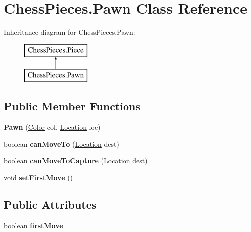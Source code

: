 \hypertarget{class_chess_pieces_1_1_pawn}{}\section{Chess\+Pieces.\+Pawn Class Reference}
\label{class_chess_pieces_1_1_pawn}
Inheritance diagram for Chess\+Pieces.\+Pawn\+:\begin{figure}[H]
\begin{center}
\leavevmode
\includegraphics[height=2.000000cm]{class_chess_pieces_1_1_pawn}
\end{center}
\end{figure}
\subsection*{Public Member Functions}
\begin{DoxyCompactItemize}
\item 
{\bfseries Pawn} (\hyperlink{enum_chess_pieces_1_1_color}{Color} col, \hyperlink{class_chess_pieces_1_1_location}{Location} loc)\hypertarget{class_chess_pieces_1_1_pawn_a41a1661e7bb1ef858a8910002441cbdc}{}\label{class_chess_pieces_1_1_pawn_a41a1661e7bb1ef858a8910002441cbdc}

\item 
boolean {\bfseries can\+Move\+To} (\hyperlink{class_chess_pieces_1_1_location}{Location} dest)\hypertarget{class_chess_pieces_1_1_pawn_a33355d440166cb93ec9a2d7f3d093a0b}{}\label{class_chess_pieces_1_1_pawn_a33355d440166cb93ec9a2d7f3d093a0b}

\item 
boolean {\bfseries can\+Move\+To\+Capture} (\hyperlink{class_chess_pieces_1_1_location}{Location} dest)\hypertarget{class_chess_pieces_1_1_pawn_a18f401bcfc49e6617612b9db24ab0848}{}\label{class_chess_pieces_1_1_pawn_a18f401bcfc49e6617612b9db24ab0848}

\item 
void {\bfseries set\+First\+Move} ()\hypertarget{class_chess_pieces_1_1_pawn_a2bcb5a1bbe6489d931faecec6857b786}{}\label{class_chess_pieces_1_1_pawn_a2bcb5a1bbe6489d931faecec6857b786}

\end{DoxyCompactItemize}
\subsection*{Public Attributes}
\begin{DoxyCompactItemize}
\item 
boolean {\bfseries first\+Move}\hypertarget{class_chess_pieces_1_1_pawn_a0d9eb25603976225bc14de9b508c8e62}{}\label{class_chess_pieces_1_1_pawn_a0d9eb25603976225bc14de9b508c8e62}

\end{DoxyCompactItemize}
